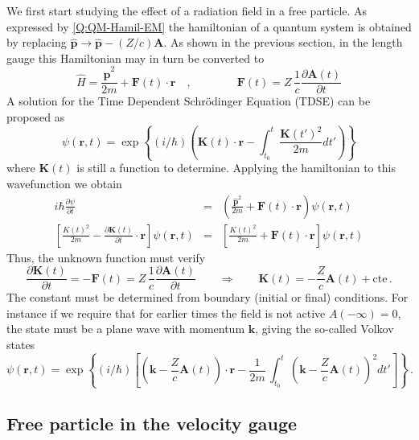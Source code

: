 We first start studying the effect of a radiation field in a free particle. As expressed by \ref{Q:QM-Hamil-EM} the hamiltonian of a quantum system is obtained by replacing $\hat{\bm{p}} \to \hat{\bm{p}}-( Z / c ) \bm{A}$. As shown in the previous section, in the length gauge this Hamiltonian may in turn be converted to
\begin{equation}\label{Q:Schro-eq-free-parti}
  \hat{H} = \frac{\hat{\bm{p}}^{2}}{2m} + \bm{F}(t) \cdot \bm{r}  \quad  , \qquad \qquad  \bm{F}(t)= Z\, \frac{1}{c} \frac{\partial \bm{A}(t)}{\partial t} 
\end{equation}
%
A solution for the Time Dependent Schr\"{o}dinger Equation (TDSE) can be proposed as
\[
\psi(\bm{r},t) = \exp{\left\{ (i/\hbar)\left(  \bm{K}(t) \cdot \bm{r} - \int_{t_{0}}^{t}\frac{\bm{K}(t')^{2}}{2m} dt' \right) \right\}}
\]
where $\bm{K}(t)$ is still a function to determine. Applying the hamiltonian to this wavefunction we obtain
%
 \begin{eqnarray*}
  i \hbar \frac{\partial \psi}{\partial t} &=& \left(  \frac{\hat{\bm{p}}^{2}}{2m} + \bm{F}(t) \cdot \bm{r}  \right) \psi(\bm{r},t) \\
\left[ \frac{K(t)^{2}}{2m} - \frac{\partial \bm{K}(t)}{\partial t} \cdot \bm{r} \right] \psi(\bm{r},t)  &=& \left[ \frac{K(t)^{2}}{2m}  + \bm{F}(t) \cdot \bm{r} \right] \psi(\bm{r},t) 
\end{eqnarray*}
Thus, the unknown function must verify
\begin{equation}
\label{Q:ph-volkov-K}  \frac{\partial \bm{K}(t)}{\partial t} = - \bm{F}(t)= Z\, \frac{1}{c} \frac{\partial \bm{A}(t)}{\partial t}  \qquad \Rightarrow \qquad  \bm{K}(t)= - \frac{Z}{c} \bm{A}(t) + \mathrm{cte} \, .
\end{equation}
%
The constant must be determined from boundary (initial or final) conditions. For instance if we require that for earlier times the field is not active $A(-\infty)=$0, the state must be a plane wave with momentum $\bm{k}$, giving the so-called Volkov states
\begin{equation} \label{Q:ph-volkov-state}
\psi(\bm{r},t) = \exp{\left\{ (i/\hbar)\left[\left( \bm{k} - \frac{Z}{c} \bm{A}(t) \right)\cdot \bm{r} - \frac{1}{2m} \,\int_{t_{0}}^{t} \left( \bm{k} - \frac{Z}{c} \bm{A}(t) \right)^{2} dt' \right] \right\}}  \,.
\end{equation}

\subsection{Free particle in the velocity gauge}
\label{S:free-part-veloc}

